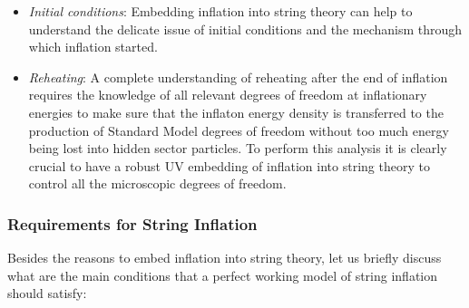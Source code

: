 \begin{itemize}
\item \emph{Initial conditions}: Embedding inflation into string theory can help to understand the delicate issue of initial conditions and the mechanism through which inflation started.

\item \emph{Reheating}: A complete understanding of reheating after the end of inflation requires the knowledge of all relevant degrees of freedom at inflationary energies to make sure that the inflaton energy density is transferred to the production of Standard Model degrees of freedom without too much energy being lost into hidden sector particles. To perform this analysis it is clearly crucial to have a robust UV embedding of inflation into string theory to control all the microscopic degrees of freedom.
\end{itemize}

\subsubsection{Requirements for String Inflation}

Besides the reasons to embed inflation into string theory, let us briefly discuss what are the main conditions that a perfect working model of string inflation should satisfy: 

